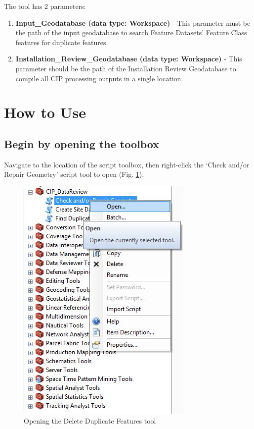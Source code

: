 \documentclass[openany]{book}
\providecommand{\tightlist}{%
  \setlength{\itemsep}{0pt}\setlength{\parskip}{0pt}}
\theoremstyle{definition}
\theoremstyle{definition}
\theoremstyle{definition}
\theoremstyle{remark}
\begin{document}
The tool has 2 parameters:

\begin{enumerate}
\def\labelenumi{\arabic{enumi}.}
\tightlist
\item
  \textbf{Input\_Geodatabase (data type: Workspace)} - This parameter
  must be the path of the input geodatabase to search Feature Datasets'
  Feature Class features for duplicate features.\\
\item
  \textbf{Installation\_Review\_Geodatabase (data type: Workspace)} -
  This parameter should be the path of the Installation Review
  Geodatabase to compile all CIP processing outputs in a single
  location.
\end{enumerate}

\section{How to Use}\label{how-to-use-4}

\subsection{Begin by opening the
toolbox}\label{begin-by-opening-the-toolbox-4}

Navigate to the location of the script toolbox, then right-click the
`Check and/or Repair Geometry' script tool to open (Fig.
\ref{fig:chkGopen}).

\begin{figure}[H]

{\centering \includegraphics{figures/chkG-open} 

}

\caption{Opening the Delete Duplicate Features tool}\label{fig:chkGopen}
\end{figure}
\end{document}
